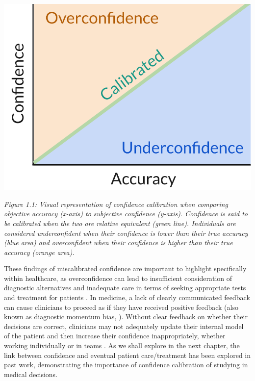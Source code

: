 \documentclass[a4paper, nobind]{templates/ociamthesis}
\begin{document}
\begin{center}\includegraphics[width=1\linewidth]{./assets/confidenceCalibration} \end{center}

\emph{Figure 1.1: Visual representation of confidence calibration when comparing objective accuracy (x-axis) to subjective confidence (y-axis). Confidence is said to be calibrated when the two are relative equivalent (green line). Individuals are considered underconfident when their confidence is lower than their true accuracy (blue area) and overconfident when their confidence is higher than their true accuracy (orange area).}

\hfill\break
These findings of miscalibrated confidence are important to highlight specifically within healthcare, as overconfidence can lead to insufficient consideration of diagnostic alternatives and inadequate care in terms of seeking appropriate tests and treatment for patients \autocite{kovacs_overconfident_2020}. In medicine, a lack of clearly communicated feedback can cause clinicians to proceed as if they have received positive feedback (also known as diagnostic momentum bias, \textcite{aron_diagnostic_2024}). Without clear feedback on whether their decisions are correct, clinicians may not adequately update their internal model of the patient and then increase their confidence inappropriately, whether working individually or in teams \autocite{jaspan_improving_2022}. As we shall explore in the next chapter, the link between confidence and eventual patient care/treatment has been explored in past work, demonstrating the importance of confidence calibration of studying in medical decisions.
\end{document}
